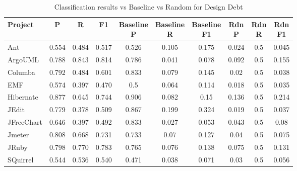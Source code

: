 \appendix{}
\label{sec:appendix}

\begin{table}[!hbt]
    \begin{center}
        \caption{Classification results vs Baseline vs Random for Design Debt}
        \label{tbl:classifier_results_vs_baseline_design}
        \begin{tabular}{l| c c c c c c c c c}
        \toprule
        \textbf{Project} & \textbf{P} & \textbf{R} & \textbf{F1} & \thead{Baseline\\P} & \thead{Baseline\\R} & \thead{Baseline\\F1} & \thead{Rdn\\P} & \thead{Rdn\\R} & \thead{Rdn\\F1} \\
        \midrule
        Ant           &   0.554 &   0.484 &  0.517 &   0.526 &  0.105 &    0.175 &  0.024 & 0.5 & 0.045 \\
        ArgoUML       &   0.788 &   0.843 &  0.814 &   0.786 &  0.041 &    0.078 &  0.092 & 0.5 & 0.155 \\
        Columba       &   0.792 &   0.484 &  0.601 &   0.833 &  0.079 &    0.145 &   0.02 & 0.5 & 0.038 \\
        EMF           &   0.574 &   0.397 &  0.470 &     0.5 &  0.064 &    0.114 &  0.018 & 0.5 & 0.035 \\
        Hibernate     &   0.877 &   0.645 &  0.744 &   0.906 &  0.082 &     0.15 &  0.136 & 0.5 & 0.214 \\
        JEdit         &   0.779 &   0.378 &  0.509 &   0.867 &  0.199 &    0.324 &  0.019 & 0.5 & 0.037 \\
        JFreeChart    &   0.646 &   0.397 &  0.492 &   0.833 &  0.027 &    0.053 &  0.043 & 0.5 &  0.08 \\
        Jmeter        &   0.808 &   0.668 &  0.731 &   0.733 &   0.07 &    0.127 &   0.04 & 0.5 & 0.075 \\
        JRuby         &   0.798 &   0.770 &  0.783 &   0.765 &  0.076 &    0.138 &  0.075 & 0.5 & 0.131 \\
        SQuirrel      &   0.544 &   0.536 &  0.540 &   0.471 &  0.038 &    0.071 &   0.03 & 0.5 & 0.056 \\
        \bottomrule
        \end{tabular}
    \end{center}    
\end{table}
                 

